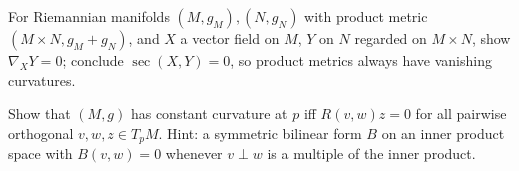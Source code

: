 \begin{remark}[Exercise 3.4.9]
  \label{rem:pet-ch3-ex-9}
  \leanok
  For Riemannian manifolds $(M,g_M),(N,g_N)$ with product metric
  $(M\times N,g_M+g_N)$, and $X$ a vector field on $M$, $Y$ on $N$ regarded on
  $M\times N$, show $\nabla_XY=0$; conclude $\sec(X,Y)=0$, so product metrics
  always have vanishing curvatures.
\end{remark}

\begin{remark}[Exercise 3.4.10]
  \label{rem:pet-ch3-ex-10}
  \leanok
  Show that $(M,g)$ has constant curvature at $p$ iff $R(v,w)z=0$ for all pairwise
  orthogonal $v,w,z\in T_pM$. Hint: a symmetric bilinear form $B$ on an inner
  product space with $B(v,w)=0$ whenever $v\perp w$ is a multiple of the inner
  product.
\end{remark}

